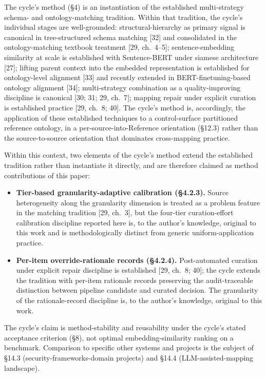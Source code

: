 \documentclass[
]{article}
\providecommand{\tightlist}{%
  \setlength{\itemsep}{0pt}\setlength{\parskip}{0pt}}
\begin{document}
The cycle's method (§4) is an instantiation of the established
multi-strategy schema- and ontology-matching tradition. Within that
tradition, the cycle's individual stages are well-grounded:
structural-hierarchy as primary signal is canonical in tree-structured
schema matching {[}32{]} and consolidated in the ontology-matching
textbook treatment {[}29, ch.~4--5{]}; sentence-embedding similarity at
scale is established with Sentence-BERT under siamese architecture
{[}27{]}; lifting parent context into the embedded representation is
established for ontology-level alignment {[}33{]} and recently extended
in BERT-finetuning-based ontology alignment {[}34{]}; multi-strategy
combination as a quality-improving discipline is canonical {[}30; 31;
29, ch.~7{]}; mapping repair under explicit curation is established
practice {[}29, ch.~8; 40{]}. The cycle's method is, accordingly, the
application of these established techniques to a control-surface
partitioned reference ontology, in a per-source-into-Reference
orientation (§12.3) rather than the source-to-source orientation that
dominates cross-mapping practice.

Within this context, two elements of the cycle's method extend the
established tradition rather than instantiate it directly, and are
therefore claimed as method contributions of this paper:

\begin{itemize}
\tightlist
\item
  \textbf{Tier-based granularity-adaptive calibration (§4.2.3).} Source
  heterogeneity along the granularity dimension is treated as a problem
  feature in the matching tradition {[}29, ch.~3{]}, but the four-tier
  curation-effort calibration discipline reported here is, to the
  author's knowledge, original to this work and is methodologically
  distinct from generic uniform-application practice.
\item
  \textbf{Per-item override-rationale records (§4.2.4).} Post-automated
  curation under explicit repair discipline is established {[}29, ch.~8;
  40{]}; the cycle extends the tradition with per-item rationale records
  preserving the audit-traceable distinction between pipeline candidate
  and curated decision. The granularity of the rationale-record
  discipline is, to the author's knowledge, original to this work.
\end{itemize}

The cycle's claim is method-stability and reusability under the cycle's
stated acceptance criterion (§8), not optimal embedding-similarity
ranking on a benchmark. Comparison to specific other systems and
projects is the subject of §14.3 (security-frameworks-domain projects)
and §14.4 (LLM-assisted-mapping landscape).
\end{document}
